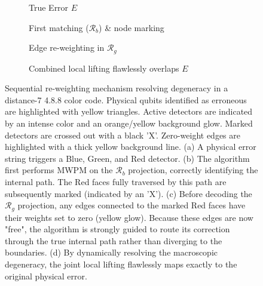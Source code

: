 \documentclass{article}
\begin{document}
\begin{figure}[hbt!]
    \centering
    \begin{subfigure}[b]{0.48\textwidth}
        \centering
        \resizebox{\linewidth}{!}{
            
        }
        \caption{True Error $E$}
        \label{fig:corr_working_2_a}
    \end{subfigure}
    \hfill
    \begin{subfigure}[b]{0.48\textwidth}
        \centering
        \resizebox{\linewidth}{!}{
            
        }
        \caption{First matching ($\mathcal{R}_b$) \& node marking}
        \label{fig:corr_working_2_b}
    \end{subfigure}
    
    \vspace{0.5cm}
    
    \begin{subfigure}[b]{0.48\textwidth}
        \centering
        \resizebox{\linewidth}{!}{
            
        }
        \caption{Edge re-weighting in $\mathcal{R}_g$}
        \label{fig:corr_working_2_c}
    \end{subfigure}
    \hfill
    \begin{subfigure}[b]{0.48\textwidth}
        \centering
        \resizebox{\linewidth}{!}{
            
        }
        \caption{Combined local lifting flawlessly overlaps $E$}
        \label{fig:corr_working_2_d}
    \end{subfigure}
    
    \caption{Sequential re-weighting mechanism resolving degeneracy in a distance-7 4.8.8 color code. Physical qubits identified as erroneous are highlighted with yellow triangles. Active detectors are indicated by an intense color and an orange/yellow background glow. Marked detectors are crossed out with a black 'X'. Zero-weight edges are highlighted with a thick yellow background line. (a) A physical error string triggers a Blue, Green, and Red detector. (b) The algorithm first performs MWPM on the $\mathcal{R}_b$ projection, correctly identifying the internal path. The Red faces fully traversed by this path are subsequently marked (indicated by an 'X'). (c) Before decoding the $\mathcal{R}_g$ projection, any edges connected to the marked Red faces have their weights set to zero (yellow glow). Because these edges are now "free", the algorithm is strongly guided to route its correction through the true internal path rather than diverging to the boundaries. (d) By dynamically resolving the macroscopic degeneracy, the joint local lifting flawlessly maps exactly to the original physical error.}
    \label{fig:correlated_working_2}
\end{figure}
\end{document}
